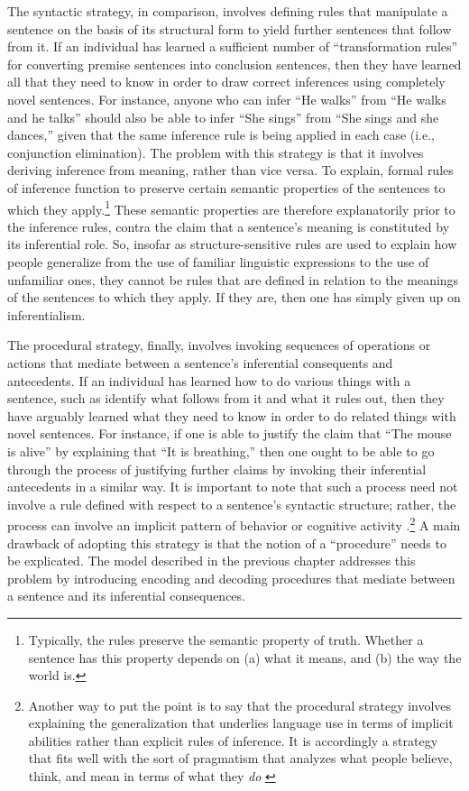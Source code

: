 The syntactic strategy, in comparison, involves defining rules that manipulate a sentence on the basis of its structural form to yield further sentences that follow from it. If an individual has learned a sufficient number of ``transformation rules'' for converting premise sentences into conclusion sentences, then they have learned all that they need to know in order to draw correct inferences using completely novel sentences. For instance, anyone who can infer ``He walks'' from ``He walks and he talks'' should also be able to infer ``She sings'' from ``She sings and she dances,'' given that the same inference rule is being applied in each case (i.e., conjunction elimination). The problem with this strategy is that it involves deriving inference from meaning, rather than vice versa. To explain, formal rules of inference function to preserve certain semantic properties of the sentences to which they apply.\footnote{Typically, the rules preserve the semantic property of truth. Whether a sentence has this property depends on (a) what it means, and (b) the way the world is.} These semantic properties are therefore explanatorily prior to the inference rules, contra the claim that a sentence's meaning is constituted by its inferential role. So, insofar as structure-sensitive rules are used to explain how people generalize from the use of familiar linguistic expressions to the use of unfamiliar ones, they cannot be rules that are defined in relation to the meanings of the sentences to which they apply. If they are, then one has simply given up on inferentialism.

The procedural strategy, finally, involves invoking sequences of operations or actions that mediate between a sentence's inferential consequents and antecedents. If an individual has learned how to do various things with a sentence, such as identify what follows from it and what it rules out, then they have arguably learned what they need to know in order to do related things with novel sentences. For instance, if one is able to justify the claim that ``The mouse is alive'' by explaining that ``It is breathing,'' then one ought to be able to go through the process of justifying further claims by invoking their inferential antecedents in a similar way. It is important to note that such a process need not involve a rule defined with respect to a sentence's syntactic structure; rather, the process can involve an implicit pattern of behavior or cognitive activity \citep{Brandom:1994}.\footnote{Another way to put the point is to say that the procedural strategy involves explaining the generalization that underlies language use in terms of implicit abilities rather than explicit rules of inference. It is accordingly a strategy that fits well with the sort of pragmatism that analyzes what people believe, think, and mean in terms of what they \textit{do} \citep{Brandom:2011,Brandom:1994,Misak:2007,Misak:2013}} A main drawback of adopting this strategy is that the notion of a ``procedure'' needs to be explicated. The model described in the previous chapter addresses this problem by introducing encoding and decoding procedures that mediate between a sentence and its inferential consequences. 

